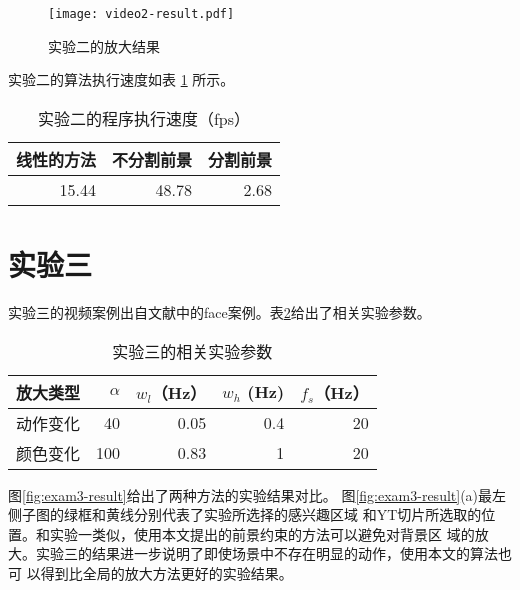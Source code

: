 \begin{figure}[htbp]
  \centering
  \texttt{[image: video2-result.pdf]}
  \caption{实验二的放大结果}
  \label{fig:exam2-result}
\end{figure}

实验二的算法执行速度如表 \ref{tab:time2} 所示。

\begin{table}[htbp]
  \centering
  \caption{实验二的程序执行速度（fps）}
  \label{tab:time2}
  \begin{tabular}[c]{rrr}
    \toprule[1.5pt]
    线性的方法 & 不分割前景 & 分割前景 \\
    \midrule
    15.44 & 48.78 & 2.68 \\
    \bottomrule[1.5pt]
  \end{tabular}
\end{table}


\section{实验三}
\label{sec:exam-face}

实验三的视频案例出自文献\cite{wu2012eulerian}中的face案例。表\ref{tab:exam3-data}给出了相关实验参数。

\begin{table}[htbp]
  \centering
  \caption{实验三的相关实验参数}
  \label{tab:exam3-data}
  \begin{tabular}[c]{crrrr}
    \toprule[1.5pt]
    放大类型 & $\alpha$ & $w_l$（Hz） & $w_h$ (Hz) & $f_s$（Hz）\\
    \midrule
    动作变化 & 40 & 0.05 & 0.4 & 20 \\
    颜色变化 & 100 & 0.83 & 1 & 20 \\
    \bottomrule[1.5pt]
  \end{tabular}
\end{table}

图\ref{fig:exam3-result}给出了两种方法的实验结果对比。
图\ref{fig:exam3-result}(a)最左侧子图的绿框和黄线分别代表了实验所选择的感兴趣区域
和YT切片所选取的位置。和实验一类似，使用本文提出的前景约束的方法可以避免对背景区
域的放大。实验三的结果进一步说明了即使场景中不存在明显的动作，使用本文的算法也可
以得到比全局的放大方法更好的实验结果。

